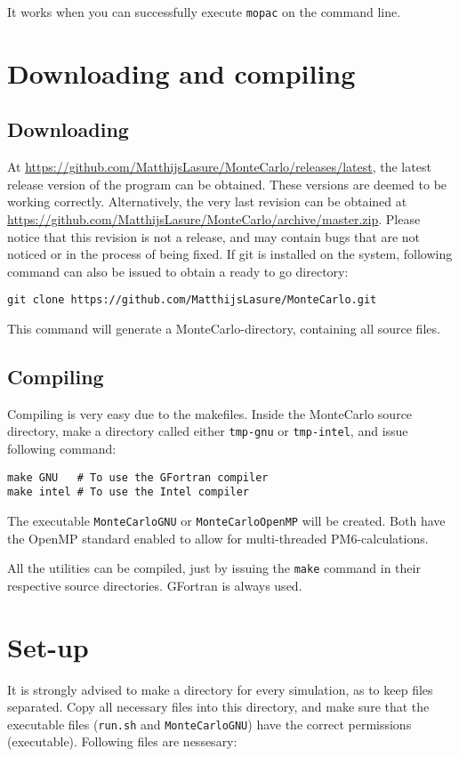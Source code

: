 It works when you can successfully execute \verb|mopac| on the command line.

\section{Downloading and compiling}

\subsection{Downloading}
At \url{https://github.com/MatthijsLasure/MonteCarlo/releases/latest}, the 
latest release version of the program can be obtained. These versions are 
deemed to be working correctly.
Alternatively, the very last revision can be obtained at 
\url{https://github.com/MatthijsLasure/MonteCarlo/archive/master.zip}.
Please notice that this revision is not a release, and may contain bugs that 
are not noticed or in the process of being fixed. If git is installed on the 
system, following command can also be issued to obtain a ready to go directory:

\begin{lstlisting}[caption=Clone with git]
git clone https://github.com/MatthijsLasure/MonteCarlo.git
\end{lstlisting}

This command will generate a MonteCarlo-directory, containing all source files.

\subsection{Compiling}
Compiling is very easy due to the makefiles.
Inside the MonteCarlo source directory, make a directory called either 
\verb|tmp-gnu| or \verb|tmp-intel|, and issue following command:

\begin{lstlisting}[caption=Compiling the main program]
make GNU   # To use the GFortran compiler
make intel # To use the Intel compiler
\end{lstlisting}

The executable \verb|MonteCarloGNU| or \verb|MonteCarloOpenMP| will be created.
Both have the OpenMP standard enabled to allow for multi-threaded 
PM6-calculations.

All the utilities can be compiled, just by issuing the \verb|make| command in 
their respective source directories. GFortran is always used.

\section{Set-up}
It is strongly advised to make a directory for every simulation, as to keep 
files separated. Copy all necessary files into this directory, and make sure 
that the executable files (\verb|run.sh| and \verb|MonteCarloGNU|) have the 
correct permissions (executable). Following files are nessesary:

